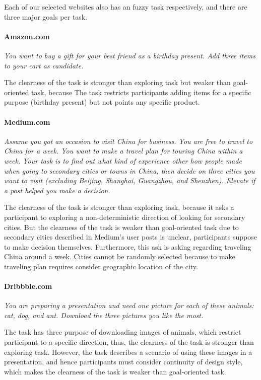 Each of our selected websites also has an fuzzy task respectively, and there are three major goals per task.

\paragraph{Amazon.com} \emph{You want to buy a gift for your best friend as a birthday present.
        Add three items to your cart as candidate.}

The clearness of the task is stronger than exploring task but weaker than goal-oriented task, because
The task restricts participants adding items for a specific purpose (birthday present) but not points
any specific product.

\paragraph{Medium.com} \emph{Assume you got an occasion to visit China for business. 
        You are free to travel to China for a week. 
        You want to make a travel plan for touring China within a week. Your task is to find out what kind 
        of experience other how people made when going to secondary cities or towns in China, then decide 
        on three cities you want to visit (excluding  Beijing, Shanghai, Guangzhou, and Shenzhen). 
        Elevate if a post helped you make a decision.}

The clearness of the task is stronger than exploring task, because it asks a participant 
to exploring a non-deterministic direction of looking for secondary cities.
But the clearness of the task is weaker than goal-oriented task due to secondary cities described
in Medium's user posts is unclear, participants suppose to make decision themselves.
Furthermore, this ask is asking regarding traveling China around a week. Cities cannot be randomly
selected because to make traveling plan requires consider geographic location of the city.

\paragraph{Dribbble.com} \emph{You are preparing a presentation and need one picture for each of these animals: 
    cat, dog, and ant. Download the three pictures you like the most.}

The task has three purpose of downloading images of animals, which restrict participant to a specific direction,
thus, the clearness of the task is stronger than exploring task. However, the task describes a scenario of using
these images in a presentation, and hence participants must consider continuity of design style, which makes
the clearness of the task is weaker than goal-oriented task.

\cleardoublepage